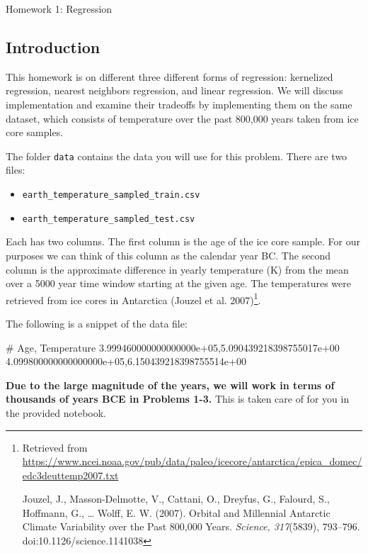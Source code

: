 \documentclass[submit]{harvardml}
\begin{document}
\begin{center}
{\Large Homework 1: Regression}\\
\end{center}

\subsection*{Introduction}
This homework is on different three different forms of regression: kernelized regression, nearest neighbors regression, 
and linear regression.  We will discuss implementation and examine their tradeoffs by implementing them on the same dataset, 
which consists of temperature over the past 800,000 years taken from ice core samples.

The folder \verb|data| contains the data you will use for this problem. There are two files:
\begin{itemize}
    \item \verb|earth_temperature_sampled_train.csv| 
    \item \verb|earth_temperature_sampled_test.csv|
\end{itemize} 

Each has two columns.  The first column is the age of the ice core sample. For our purposes we can 
think of this column as the calendar year BC. The second column is the approximate difference in 
yearly temperature (K) from the mean  over a 5000 year time window starting at the given age. 
The temperatures were retrieved from ice cores in Antarctica (Jouzel 
et al. 2007)\footnote{Retrieved from \url{https://www.ncei.noaa.gov/pub/data/paleo/icecore/antarctica/epica_domec/edc3deuttemp2007.txt}


Jouzel, J., Masson-Delmotte, V., Cattani, O., Dreyfus, G., Falourd, 
S., Hoffmann, G., … Wolff, E. W. (2007). Orbital and Millennial 
Antarctic Climate Variability over the Past 800,000 Years. 
\emph{Science, 317}(5839), 793–796. doi:10.1126/science.1141038}.
 
 The following is a snippet of the data file:
 
\begin{csv}
# Age, Temperature
3.999460000000000000e+05,5.090439218398755017e+00
4.099800000000000000e+05,6.150439218398755514e+00
\end{csv}

\textbf{Due to the large magnitude of the years, we will work in terms of thousands of years BCE in Problems 1-3.} This is taken care of for you in the provided notebook.
\end{document}
